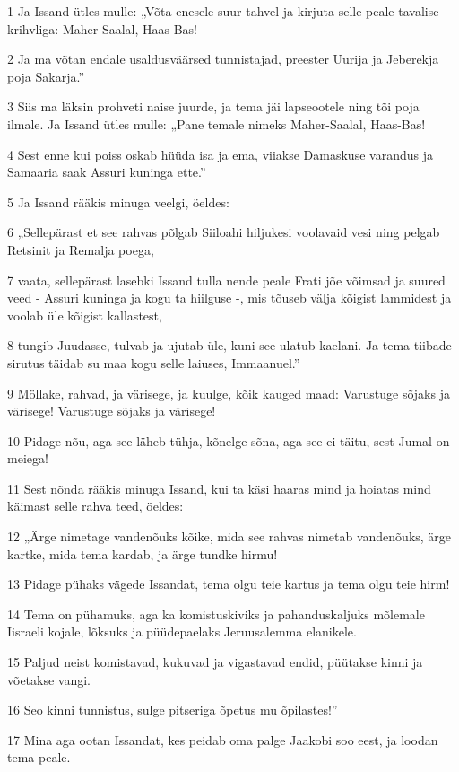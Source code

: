 \par 1 Ja Issand ütles mulle: „Võta enesele suur tahvel ja kirjuta selle peale tavalise krihvliga: Maher-Saalal, Haas-Bas!
\par 2 Ja ma võtan endale usaldusväärsed tunnistajad, preester Uurija ja Jeberekja poja Sakarja.”
\par 3 Siis ma läksin prohveti naise juurde, ja tema jäi lapseootele ning tõi poja ilmale. Ja Issand ütles mulle: „Pane temale nimeks Maher-Saalal, Haas-Bas!
\par 4 Sest enne kui poiss oskab hüüda isa ja ema, viiakse Damaskuse varandus ja Samaaria saak Assuri kuninga ette.”
\par 5 Ja Issand rääkis minuga veelgi, öeldes:
\par 6 „Sellepärast et see rahvas põlgab Siiloahi hiljukesi voolavaid vesi ning pelgab Retsinit ja Remalja poega,
\par 7 vaata, sellepärast lasebki Issand tulla nende peale Frati jõe võimsad ja suured veed - Assuri kuninga ja kogu ta hiilguse -, mis tõuseb välja kõigist lammidest ja voolab üle kõigist kallastest,
\par 8 tungib Juudasse, tulvab ja ujutab üle, kuni see ulatub kaelani. Ja tema tiibade sirutus täidab su maa kogu selle laiuses, Immaanuel.”
\par 9 Möllake, rahvad, ja värisege, ja kuulge, kõik kauged maad: Varustuge sõjaks ja värisege! Varustuge sõjaks ja värisege!
\par 10 Pidage nõu, aga see läheb tühja, kõnelge sõna, aga see ei täitu, sest Jumal on meiega!
\par 11 Sest nõnda rääkis minuga Issand, kui ta käsi haaras mind ja hoiatas mind käimast selle rahva teed, öeldes:
\par 12 „Ärge nimetage vandenõuks kõike, mida see rahvas nimetab vandenõuks, ärge kartke, mida tema kardab, ja ärge tundke hirmu!
\par 13 Pidage pühaks vägede Issandat, tema olgu teie kartus ja tema olgu teie hirm!
\par 14 Tema on pühamuks, aga ka komistuskiviks ja pahanduskaljuks mõlemale Iisraeli kojale, lõksuks ja püüdepaelaks Jeruusalemma elanikele.
\par 15 Paljud neist komistavad, kukuvad ja vigastavad endid, püütakse kinni ja võetakse vangi.
\par 16 Seo kinni tunnistus, sulge pitseriga õpetus mu õpilastes!”
\par 17 Mina aga ootan Issandat, kes peidab oma palge Jaakobi soo eest, ja loodan tema peale.
